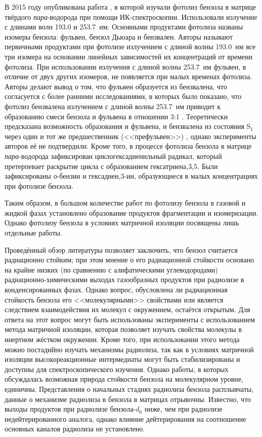 {В 2015 году опубликована работа \cite{Toh2015}, в которой изучали фотолиз бензола в матрице твёрдого {\it пара}-водорода при помощи ИК-спектроскопии. Использовали излучение с длинами волн 193.0 и 253.7~нм. Основными продуктами фотолиза названы изомеры бензола: 
фульвен, бензол Дьюара и бензвален. Авторы называют первичными продуктами при фотолизе излучением с длиной волны 193.0~нм все три изомера на основании линейных зависимостей их концентраций от времени фотолиза. 
При использовании излучения с длиной волны 253.7~нм фульвен, в отличие от двух других изомеров, не появляется при малых временах фотолиза. Авторы 
делают вывод о том, что фульвен образуется из бензвалена, что согласуется с  более ранними исследованиями, в которых было показано, что фотолиз бензвалена излучением 
с длиной волны 253.7~нм приводит к образованию смеси бензола и фульвена в отношении 3:1 \cite{Kaplan1968, Harman1981}. 
Теоретически предсказана возможность образования и фульвена, и бензвалена из состояния S$_1$ через один и тот же предшественник (<<префульвен>>) \cite{Dreyer1996, Jano1968}, однако эксперименты авторов \cite{Toh2015} её не подтвердили.
Кроме того, в процессе фотолиза бензола в матрице {\it пара}-водорода зафиксирован циклогексадиенильный радикал, который претерпевает раскрытие цикла с образованием гексатриена,3,5. 
Были зафиксированы {\it о}-бензин и гексадиен,3\nobreakdash-ин, образующиеся в малых концентрациях при фотолизе бензола. 
 
 Таким образом, в большом количестве работ по фотолизу бензола в газовой и жидкой фазах установлено образование продуктов фрагментации и изомеризации. Однако фотолизу бензола в условиях матричной изоляции посвящены лишь отдельные работы.
  
\vspace{1cm}
 Проведённый обзор литературы позволяет заключить, что бензол считается радиационно стойким; при этом мнение о его радиационной стойкости
 основано на крайне низких (по сравнению с алифатическими углеводородами) радиационно-химическими выходах газообразных продуктов при радиолизе в конденсированных фазах. Однако вопрос, обусловлена ли радиационная стойкость бензола его <<молекулярными>> свойствами или является следствием взаимодействия их молекул   с окружением, остаётся открытым. Для ответа на этот вопрос могут быть использованы эксперименты с использованием метода матричной изоляции, которая позволяет изучать свойства молекулы в инертном жёстком окружении. Кроме того, при использовании этого метода можно постадийно изучать механизмы радиолиза,
так как в условиях матричной изоляции высокореакционные интермедиаты могут быть стабилизированы и доступны для спектроскопического изучения.
   Однако работы, в которых обсуждалась возможная природа стойкости бензола на молекулярном уровне, единичны. Представления о начальных стадиях радиолиза бензола расплывчаты, данные о механизме радиолиза в бензола в матрицах отрывочны. Известно, что выходы продуктов при радиолизе бензола-$d_6$ ниже, чем при радиолизе недейтерированного аналога, однако влияние  дейтерирования на соотношение основных каналов радиолиза не установлено.
 
}
